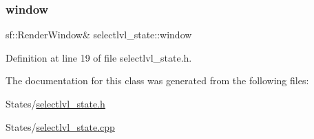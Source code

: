 \hypertarget{classselectlvl__state_adc49d09d9d1fee70b893edf520f672f0}{}\label{classselectlvl__state_adc49d09d9d1fee70b893edf520f672f0} 
\subsubsection{\texorpdfstring{window}{window}}
{\footnotesize\ttfamily sf\+::\+Render\+Window\& selectlvl\+\_\+state\+::window}



Definition at line 19 of file selectlvl\+\_\+state.\+h.



The documentation for this class was generated from the following files\+:\begin{DoxyCompactItemize}
\item 
States/\hyperlink{selectlvl__state_8h}{selectlvl\+\_\+state.\+h}\item 
States/\hyperlink{selectlvl__state_8cpp}{selectlvl\+\_\+state.\+cpp}\end{DoxyCompactItemize}
